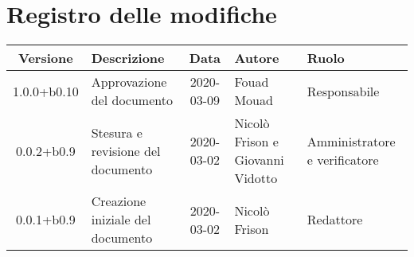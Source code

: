 \section*{Registro delle modifiche}

\begin{center}
	\begin{longtable}{|c|p{3.5cm}|c|p{3cm}|p{3cm}|}
	\hline
	\rowcolor{lighter-grayer}
	\textbf{Versione} & \textbf{Descrizione} & \textbf{Data} & \textbf{Autore} & \textbf{Ruolo} \\
	\hline
	\endfirsthead

	1.0.0+b0.10 & Approvazione del documento & 2020-03-09 & Fouad Mouad & Responsabile \\
	\hline
	0.0.2+b0.9 & Stesura e revisione del documento & 2020-03-02 & Nicolò Frison e Giovanni Vidotto & Amministratore e verificatore \\
	\hline
	0.0.1+b0.9 & Creazione iniziale del documento & 2020-03-02 & Nicolò Frison & Redattore \\
	\hline

	\end{longtable}
\end{center}